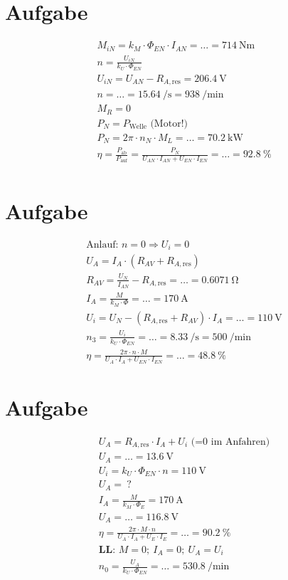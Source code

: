 \documentclass[10pt,a4paper]{article}
\begin{document}
\section{Aufgabe}
\begin{align*}
M_{iN} = k_M \cdot \Phi_{EN} \cdot I_{AN} = \ldots = \SI{714}{\newton\meter}\\
n = \frac{U_{iN}}{k_U \cdot \Phi_{EN}}\\
U_{iN} = U_{AN} - R_{A, \text{res}} = \SI{206.4}{\volt}\\
n = \ldots = \SI{15.64}{\per\second} = \SI{938}{\per\minute}\\
M_R = 0\\
P_N = P_\text{Welle} \text{ (Motor!)}\\
P_N = 2\pi \cdot n_N \cdot M_L = \ldots = \SI{70.2}{\kilo\watt}\\
\eta = \frac{P_\text{ab}}{P_\text{auf}} = \frac{P_N}{U_{AN} \cdot I_{AN} + U_{EN} \cdot I_{EN}} = \ldots = \SI{92.8}{\percent}\\
\end{align*}

\section{Aufgabe}
\begin{align*}
\text{Anlauf: } n = 0 \Rightarrow U_i = 0\\
U_A = I_A \cdot \left( R_{AV} + R_{A, \text{res}} \right)\\
R_{AV} = \frac{U_N}{I_{AN}} - R_{A, \text{res}} = \ldots = \SI{0.6071}{\ohm}\\
I_A = \frac{M}{k_M \cdot \Phi} = \ldots = \SI{170}{\ampere}\\
U_i = U_N - \left( R_{A, \text{res}} + R_{AV}\right) \cdot I_A = \ldots = \SI{110}{\volt}\\
n_3 = \frac{U_i}{k_U \cdot \Phi_{EN}} = \ldots = \SI{8.33}{\per\second} = \SI{500}{\per\minute}\\
\eta = \frac{2\pi \cdot n \cdot M}{U_A \cdot I_A + U_{EN} \cdot I_{EN}} = \ldots = \SI{48.8}{\percent}
\end{align*}

\section{Aufgabe}
\begin{align*}
U_A = R_{A, \text{res}} \cdot I_A + U_i \text{ (=0 im Anfahren)}\\
U_A = \ldots = \SI{13.6}{\volt}\\
U_i = k_U \cdot \Phi_{EN} \cdot n = \SI{110}{\volt}\\
U_A =\ ?\\
I_A = \frac{M}{k_M \cdot \Phi_E} = \SI{170}{\ampere}\\
U_A = \ldots = \SI{116.8}{\volt}\\
\eta = \frac{2\pi \cdot M \cdot n}{U_A \cdot I_A + U_E \cdot I_E} = \ldots = \SI{90.2}{\percent}\\
\textbf{LL: } M = 0;\ I_A = 0;\ U_A = U_i\\
n_0 = \frac{U_A}{k_U \cdot \Phi_{EN}} = \ldots = \SI{530.8}{\per\minute}
\end{align*}
\end{document}
